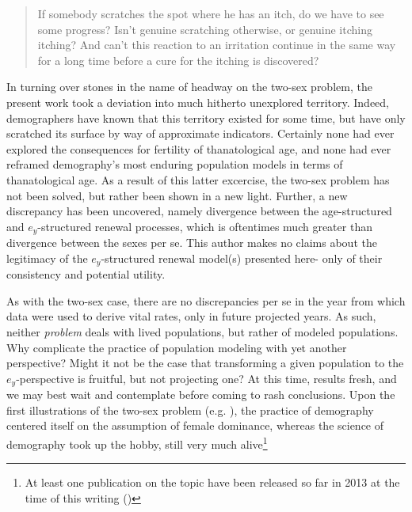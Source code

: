 
\begin{singlespace}
\begin{quote}
 If somebody scratches the spot where he has an itch, do we have to see 
 some progress? Isn't genuine scratching otherwise, or genuine itching 
itching? And can't this reaction to an irritation continue in the 
same way for a long time before a cure for the itching is discovered?
\citep{wittgenstein1984culture}
\end{quote}
\end{singlespace}

In turning over stones in the name of headway on the two-sex problem, the
present work took a deviation into much hitherto unexplored territory. Indeed,
demographers have known that this territory existed for some time, but have
only scratched its surface by way of approximate indicators. Certainly none had
ever explored the consequences for fertility of thanatological age, and none had
ever reframed demography's most enduring population models in terms of
thanatological age. As a result of this latter excercise, the two-sex problem
has not been solved, but rather been shown in a new light. Further, a new discrepancy 
has been uncovered, namely divergence between the age-structured and $e_y$-structured 
renewal processes, which is oftentimes much greater than divergence between 
the sexes per se. This author makes no claims about the legitimacy of 
the $e_y$-structured renewal model(s) presented here- only of their 
consistency and potential utility. 

As with the two-sex case, there are no
discrepancies per se in the year from which data were used to derive vital
rates, only in future projected years. As such, neither \textit{problem} deals with lived populations, but rather of
modeled populations. Why complicate the practice of population modeling with yet
another perspective? Might it not be the case that transforming a given
population to the $e_y$-perspective is fruitful, but not projecting one? At this
time, results fresh, and we may best wait and contemplate before coming to rash
conclusions. Upon the first illustrations of the two-sex problem (e.g.
\cite{kuczynski1932fertility}), the practice of demography centered itself on
the assumption of female dominance, whereas the science of demography took up
the hobby, still very much alive\footnote{At least one publication on the
topic have been released so far in 2013 at the time of this writing (\citet{Matthews2013})}



